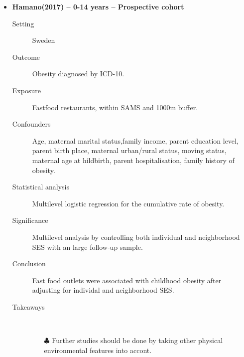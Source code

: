\documentclass{article}
\begin{document}
\begin{itemize}
\begin{description}
		\end{description}

	\vspace{5mm}

\item{\bf Hamano(2017) -- 0-14 years  -- Prospective cohort} 
		\begin{description}
			\item[Setting] Sweden
			\item[Outcome] Obesity diagnosed by ICD-10. 
			\item[Exposure] Fastfood restaurants, within SAMS and 1000m buffer.
			\item[Confounders] Age, maternal marital status,family income, parent education level, parent birth place, maternal urban/rural status, moving status, maternal age at hildbirth, parent hospitalisation, family history of obesity. 
			\item[Statistical analysis] Multilevel logistic regression for the cumulative rate of obesity. 
			\item[Significance] Multilevel analysis by controlling both individual and neighborhood SES with an large follow-up sample.
			\item[Conclusion] Fast food outlets were associated with childhood obesity after adjusting for individal and neighborhood SES.
			\item[Takeaways] \mbox{}\\
				\begin{itemize}
					\item[$\clubsuit$] Further studies should be done by taking other physical environmental features into accont.
				\end{itemize} 
			
		\end{description}



\end{itemize}
\end{document}
